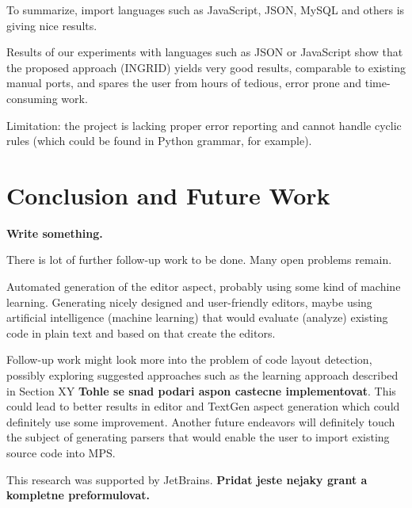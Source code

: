 \documentclass[10pt]{sigplanconf}
\newcommand{\todo}[1]{{\bfseries #1}}
\begin{document}
To summarize, import languages such as JavaScript, JSON, MySQL and others is giving nice results.

Results of our experiments with languages such as JSON or JavaScript show that the proposed approach (INGRID) yields very good results, comparable to existing manual ports, and spares the user from hours of tedious, error prone and time-consuming work.

Limitation: the project is lacking proper error reporting and cannot handle cyclic rules (which could be found in Python grammar, for example).


\section{Conclusion and Future Work}

\todo{Write something.}

There is lot of further follow-up work to be done. Many open problems remain.

Automated generation of the editor aspect, probably using some kind of machine learning.
Generating nicely designed and user-friendly editors, maybe using artificial intelligence (machine learning) that would evaluate (analyze) existing code in plain text and based on that create the editors.

Follow-up work might look more into the problem of code layout detection, possibly exploring suggested approaches such as the learning approach described in Section XY \todo{Tohle se snad podari aspon castecne implementovat}.
This could lead to better results in editor and TextGen aspect generation which could definitely use some improvement.
Another future endeavors will definitely touch the subject of generating parsers that would enable the user to import existing source code into MPS.



\acks
This research was supported by JetBrains. \todo{Pridat jeste nejaky grant a kompletne preformulovat.}


\end{document}
